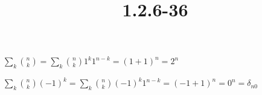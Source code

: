 \documentclass{article}
\title{1.2.6-36}
\begin{document}
\maketitle

\( \sum_k \binom{n}{k} = \sum_k \binom{n}{k} 1^k1^{n-k} = (1+1)^n = 2^n \)

\( \sum_k \binom{n}{k}(-1)^k = \sum_k \binom{n}{k} (-1)^k1^{n-k} = (-1+1)^n = 0^n = \delta_{n0} \)
\end{document}

